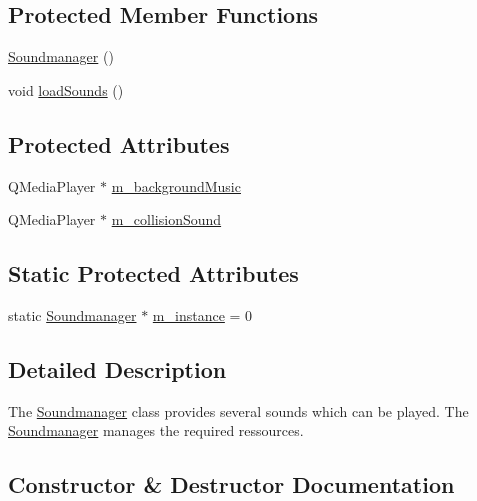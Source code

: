 \subsection*{Protected Member Functions}
\begin{DoxyCompactItemize}
\item 
\hyperlink{class_soundmanager_a8b484955e5732155f07099e53dca61e1}{Soundmanager} ()
\item 
void \hyperlink{class_soundmanager_a97874137f1bc5dcff106b0a5faeca828}{load\+Sounds} ()
\end{DoxyCompactItemize}
\subsection*{Protected Attributes}
\begin{DoxyCompactItemize}
\item 
Q\+Media\+Player $\ast$ \hyperlink{class_soundmanager_a39e32f7d94670486c52e78721a8f4faf}{m\+\_\+background\+Music}
\item 
Q\+Media\+Player $\ast$ \hyperlink{class_soundmanager_a824f9bfdbe61a7db3cb54cb87cb80268}{m\+\_\+collision\+Sound}
\end{DoxyCompactItemize}
\subsection*{Static Protected Attributes}
\begin{DoxyCompactItemize}
\item 
static \hyperlink{class_soundmanager}{Soundmanager} $\ast$ \hyperlink{class_soundmanager_a81105bb352bada9ff056335df0dd2bb3}{m\+\_\+instance} = 0
\end{DoxyCompactItemize}


\subsection{Detailed Description}
The \hyperlink{class_soundmanager}{Soundmanager} class provides several sounds which can be played.  The \hyperlink{class_soundmanager}{Soundmanager} manages the required ressources. 

\subsection{Constructor \& Destructor Documentation}
\hypertarget{class_soundmanager_a098a604a4cb0a238863ddb0065f11885}{}
